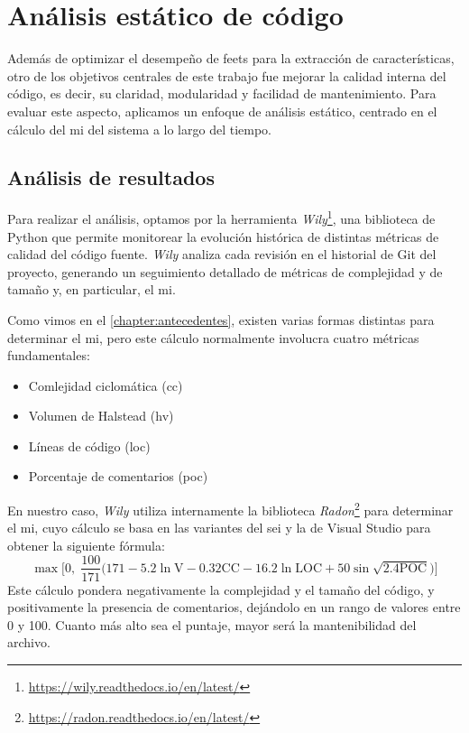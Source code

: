 \section{Análisis estático de código}

Además de optimizar el desempeño de \gls{feets} para la extracción de características, otro de los objetivos centrales de este trabajo fue mejorar la calidad interna del código, es decir, su claridad, modularidad y facilidad de mantenimiento. Para evaluar este aspecto, aplicamos un enfoque de análisis estático, centrado en el cálculo del \acrfull{mi} del sistema a lo largo del tiempo.

\subsection{Análisis de resultados}

Para realizar el análisis, optamos por la herramienta \emph{Wily}\footnote{\url{https://wily.readthedocs.io/en/latest/}}, una biblioteca de Python que permite monitorear la evolución histórica de distintas métricas de calidad del código fuente. \emph{Wily} analiza cada revisión en el historial de Git del proyecto, generando un seguimiento detallado de métricas de complejidad y de tamaño y, en particular, el \gls{mi}.

Como vimos en el \autoref{chapter:antecedentes}, existen varias formas distintas para determinar el \gls{mi}, pero este cálculo normalmente involucra cuatro métricas fundamentales:

\begin{itemize}
    \item Comlejidad ciclomática (\acrshort{cc})
    \item Volumen de Halstead (\acrshort{hv})
    \item Líneas de código (\acrshort{loc})
    \item Porcentaje de comentarios (\acrshort{poc})
\end{itemize}

En nuestro caso, \emph{Wily} utiliza internamente la biblioteca \emph{Radon}\footnote{\url{https://radon.readthedocs.io/en/latest/}} para determinar el \gls{mi}, cuyo cálculo se basa en las variantes del \gls{sei} \citep{bray1997c4} y la de Visual Studio \citep{microsoft2025mi} para obtener la siguiente fórmula: \[
    \max \Bigg[
        0, \;
        \frac{100}{171}
        \Big(
            171 - 5.2\ln{\text{V}} - 0.32\text{CC}
            - 16.2\ln{\text{LOC}} + 50 \sin{\sqrt{2.4 \text{POC}}}
        \Big)
    \Bigg]
\]
Este cálculo pondera negativamente la complejidad y el tamaño del código, y positivamente la presencia de comentarios, dejándolo en un rango de valores entre 0 y 100. Cuanto más alto sea el puntaje, mayor será la mantenibilidad del archivo.

